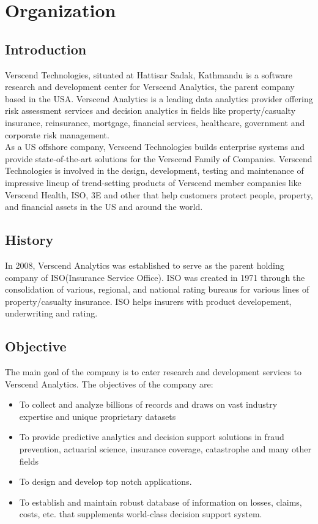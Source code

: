 \section{Organization}
\subsection{Introduction}
Verscend Technologies, situated at Hattisar Sadak, Kathmandu is a software research and development center for Verscend Analytics, the parent company based in the USA. Verscend Analytics is a leading data analytics provider offering risk assessment services and decision analytics in fields like property/casualty insurance, reinsurance, mortgage, financial services, healthcare, government and corporate risk management. \\
As a US offshore company, Verscend Technologies builds enterprise systems and provide state-of-the-art solutions for the Verscend Family of Companies. Verscend Technologies is involved in the design, development, testing and maintenance of impressive lineup of trend-setting products of Verscend member companies like Verscend Health, ISO, 3E and other that help customers protect people, property, and financial assets in the US and around the world.
\subsection{History}
In 2008, Verscend Analytics was established to serve as the parent holding company of ISO(Insurance Service Office). ISO was created in 1971 through the consolidation of various, regional, and national rating bureaus for various lines of property/casualty insurance. ISO helps insurers with product developement, underwriting and rating.
\subsection{Objective}
The main goal of the company is to cater research and development services to Verscend Analytics. The
objectives of the company are:
\begin{itemize}
\item To collect and analyze billions of records and draws on vast industry expertise and unique proprietary
datasets
\item To provide predictive analytics and decision support solutions in fraud prevention, actuarial science,
insurance coverage, catastrophe and many other fields
\item To design and develop top notch applications.
\item To establish and maintain robust database of information on losses, claims, costs, etc. that supplements
world-class decision support system.\end{itemize}
